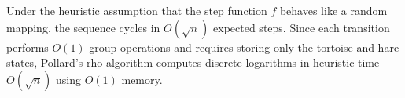 \begin{remark}
    Under the heuristic assumption that the step function \(f\) behaves like a random mapping, the sequence cycles in \(O(\sqrt{n})\) expected steps.
    Since each transition performs \(O(1)\) group operations and requires storing only the tortoise and hare states, Pollard's rho algorithm computes discrete logarithms in heuristic time \(O(\sqrt{n})\) using \(O(1)\) memory.
\end{remark}
